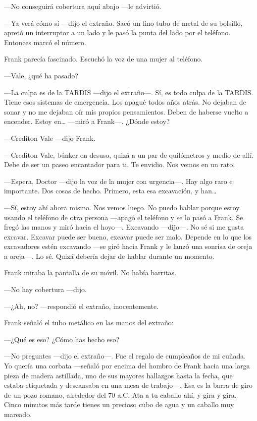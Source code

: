 ---No conseguirá cobertura aquí abajo ---le advirtió.

---Ya verá cómo sí ---dijo el extraño. Sacó un fino tubo de metal de su
bolsillo, apretó un interruptor a un lado y le pasó la punta del lado
por el teléfono. Entonces marcó el número.

Frank parecía fascinado. Escuchó la voz de una mujer al teléfono.

---Vale, ¿qué ha pasado?

---La culpa es de la TARDIS ---dijo el extraño---. Sí, es todo culpa de la
TARDIS. Tiene esos sistemas de emergencia. Los apagué todos años atrás.
No dejaban de sonar y no me dejaban oír mis propios pensamientos. Deben
de haberse vuelto a encender. Estoy en\ldots{} ---miró a Frank---. ¿Dónde
estoy?

---Crediton Vale ---dijo Frank.

---Crediton Vale, búnker en desuso, quizá a un par de quilómetros y medio
de allí. Debe de ser un paseo encantador para ti. Te envidio. Nos vemos
en un rato.

---Espera, Doctor ---dijo la voz de la mujer con urgencia---. Hay algo raro
e importante. Dos cosas de hecho. Primero, esta esa excavación, y
han\ldots{}

---Sí, estoy ahí ahora mismo. Nos vemos luego. No puedo hablar porque
estoy usando el teléfono de otra persona ---apagó el teléfono y se lo
pasó a Frank. Se fregó las manos y miró hacia el hoyo---. Excavando
---dijo---. No sé si me gusta excavar. Excavar puede ser bueno, excavar
puede ser malo. Depende en lo que los excavadores estén excavando ---se
giró hacia Frank y le lanzó una sonrisa de oreja a oreja---. Lo sé. Quizá
debería dejar de hablar durante un momento.

Frank miraba la pantalla de su móvil. No había barritas.

---No hay cobertura ---dijo.

---¿Ah, no? ---respondió el extraño, inocentemente.

Frank señaló el tubo metálico en las manos del extraño:

---¿Qué es eso? ¿Cómo has hecho eso?

---No preguntes ---dijo el extraño---. Fue el regalo de cumpleaños de mi
cuñada. Yo quería una corbata ---señaló por encima del hombro de Frank
hacia una larga pieza de madera astillada, uno de sus mayores hallazgos
hasta la fecha, que estaba etiquetada y descansaba en una mesa de
trabajo---. Esa es la barra de giro de un pozo romano, alrededor del 70
a.C. Ata a tu caballo ahí, y gira y gira. Cinco minutos más tarde tienes
un precioso cubo de agua y un caballo muy mareado.

